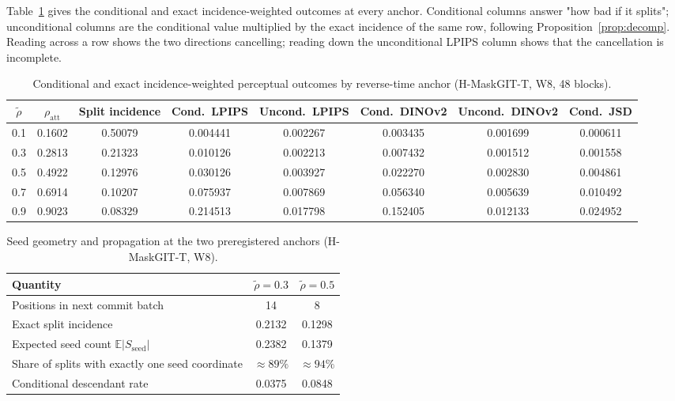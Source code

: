 \documentclass[11pt,a4paper]{article}
\theoremstyle{plain}
\theoremstyle{definition}
\theoremstyle{remark}
\newcommand{\Ex}{\mathbb{E}}
\newcommand{\rholabel}{\widetilde{\rho}}
\newcommand{\rhoatt}{\rho_{\mathrm{att}}}
\begin{document}
Table~\ref{tab:fullT} gives the conditional and exact incidence-weighted
outcomes at every anchor. Conditional columns answer "how bad if it splits";
unconditional columns are the conditional value multiplied by the exact incidence
of the same row, following Proposition~\ref{prop:decomp}. Reading across a row
shows the two directions cancelling; reading down the unconditional LPIPS column
shows that the cancellation is incomplete.

\begin{table}[h]
\centering
\caption{Conditional and exact incidence-weighted perceptual outcomes by
reverse-time anchor (H-MaskGIT-T, W8, 48 blocks).}
\label{tab:fullT}
\scriptsize
\setlength{\tabcolsep}{3pt}
\begin{tabular}{@{}cccccccc@{}}
\toprule
$\rholabel$ & $\rhoatt$ & Split incidence & Cond.\ LPIPS & Uncond.\ LPIPS
& Cond.\ DINOv2 & Uncond.\ DINOv2 & Cond.\ JSD \\
\midrule
0.1 & 0.1602 & 0.50079 & 0.004441 & 0.002267 & 0.003435 & 0.001699 & 0.000611 \\
0.3 & 0.2813 & 0.21323 & 0.010126 & 0.002213 & 0.007432 & 0.001512 & 0.001558 \\
0.5 & 0.4922 & 0.12976 & 0.030126 & 0.003927 & 0.022270 & 0.002830 & 0.004861 \\
0.7 & 0.6914 & 0.10207 & 0.075937 & 0.007869 & 0.056340 & 0.005639 & 0.010492 \\
0.9 & 0.9023 & 0.08329 & 0.214513 & 0.017798 & 0.152405 & 0.012133 & 0.024952 \\
\bottomrule
\end{tabular}
\end{table}

\begin{table}[h]
\centering
\caption{Seed geometry and propagation at the two preregistered anchors
(H-MaskGIT-T, W8).}
\label{tab:seedgeom}
\small
\begin{tabular}{@{}lcc@{}}
\toprule
Quantity & $\rholabel=0.3$ & $\rholabel=0.5$ \\
\midrule
Positions in next commit batch & 14 & 8 \\
Exact split incidence & 0.2132 & 0.1298 \\
Expected seed count $\Ex|S_{\mathrm{seed}}|$ & 0.2382 & 0.1379 \\
Share of splits with exactly one seed coordinate & $\approx 89\%$ & $\approx 94\%$ \\
Conditional descendant rate & 0.0375 & 0.0848 \\
\bottomrule
\end{tabular}
\end{table}
\end{document}
